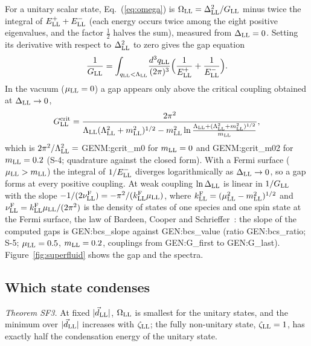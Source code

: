 For a unitary scalar state, Eq.~(\ref{eq:omega}) is $\Omega_{\rm LL}=\Delta_{\rm LL}^2/G_{\rm LL}$ minus
twice the integral of $E^+_{\rm LL}+E^-_{\rm LL}$ (each energy occurs twice among the eight positive
eigenvalues, and the factor $\tfrac12$ halves the sum), measured from $\Delta_{\rm LL}=0$. Setting its
derivative with respect to $\Delta_{\rm LL}^2$ to zero gives the gap equation
\begin{equation}
\frac1{G_{\rm LL}}=\int_{q_{\rm LL}<\Lambda_{\rm LL}}\!\frac{d^3q_{\rm LL}}{(2\pi)^3}\Big(\frac1{E^+_{\rm LL}}+\frac1{E^-_{\rm LL}}\Big).
\label{eq:gapeq}
\end{equation}
In the vacuum ($\mu_{\rm LL}=0$) a gap appears only above the critical coupling obtained at
$\Delta_{\rm LL}\to0$,
\begin{equation}
G^{\rm crit}_{\rm LL}=\frac{2\pi^2}{\Lambda_{\rm LL}(\Lambda_{\rm LL}^2+m_{\rm LL}^2)^{1/2}-m_{\rm LL}^2\ln\frac{\Lambda_{\rm LL}+(\Lambda_{\rm LL}^2+m_{\rm LL}^2)^{1/2}}{m_{\rm LL}}},
\label{eq:gcrit}
\end{equation}
which is $2\pi^2/\Lambda_{\rm LL}^2={}${{GENM:gcrit_m0}} for $m_{\rm LL}=0$ and {{GENM:gcrit_m02}} for
$m_{\rm LL}=0.2$ (S-4; quadrature against the closed form). With a Fermi surface ($\mu_{\rm LL}>m_{\rm
LL}$) the integral of $1/E^-_{\rm LL}$ diverges logarithmically as $\Delta_{\rm LL}\to0$, so a gap
forms at every positive coupling. At weak coupling $\ln\Delta_{\rm LL}$ is linear in $1/G_{\rm LL}$ with
the slope $-1/(2\nu^{\rm F}_{\rm LL})=-\pi^2/(k^{\rm F}_{\rm LL}\mu_{\rm LL})$, where $k^{\rm F}_{\rm
LL}=(\mu_{\rm LL}^2-m_{\rm LL}^2)^{1/2}$ and $\nu^{\rm F}_{\rm LL}=k^{\rm F}_{\rm LL}\mu_{\rm LL}/(2\pi^2)$
is the density of states of one species and one spin state at the Fermi surface, the law of Bardeen,
Cooper and Schrieffer~\cite{BCS1957}: the slope of the computed gaps is {{GEN:bcs_slope}} against
{{GEN:bcs_value}} (ratio {{GEN:bcs_ratio}}; S-5; $\mu_{\rm LL}=0.5$, $m_{\rm LL}=0.2$, couplings from
{{GEN:G_first}} to {{GEN:G_last}}). Figure~\ref{fig:superfluid} shows the gap and the spectra.

\subsection{Which state condenses}

\noindent\emph{Theorem SF3.} At fixed $\lvert\vec d_{\rm LL}\rvert$, $\Omega_{\rm LL}$ is smallest for the
unitary states, and the minimum over $\lvert\vec d_{\rm LL}\rvert$ increases with $\zeta_{\rm LL}$; the
fully non-unitary state, $\zeta_{\rm LL}=1$, has exactly half the condensation energy of the unitary state.

